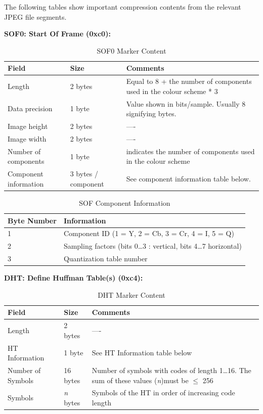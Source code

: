 The following tables show important compression contents from the relevant JPEG file segments.

\newpage

\textbf{SOF0: Start Of Frame (0xc0):}

\begin{table}[!hbtp]
	\caption{SOF0 Marker Content}
	\centering
	\begin{tabular}{ | p{2cm} | p{1.5cm} | p{4cm} | }
	\hline
	\textbf{Field} & \textbf{Size} & \textbf{Comments} \\ \hline
	Length & 2 bytes & Equal to 8 + the number of components used in the colour scheme * 3\\ \hline
	Data precision & 1 byte & Value shown in bits/sample. Usually 8 signifying bytes.\\ \hline
	Image height  & 2 bytes & ----\\ \hline
	Image width  & 2 bytes & ----\\ \hline
	Number of components & 1 byte & indicates the number of components used  in the colour scheme\\ \hline
	Component information & 3 bytes / component & See component information table below.\\ \hline
	\end{tabular}
\end{table}

\begin{table}[!hbtp]
	\caption{SOF Component Information}
	\centering
	\begin{tabular}{ | p{2cm} | p{4cm} | }
	\hline
	\textbf{Byte Number} &  \textbf{Information} \\ \hline
	1 & Component ID (1 = Y, 2 = Cb, 3 = Cr, 4 = I, 5 = Q)\\ \hline
	2 & Sampling factors (bits 0\ldots3 : vertical, bits 4\ldots7 horizontal)\\ \hline
	3 & Quantization table number\\ \hline
	\end{tabular}
\end{table}

\newpage

\textbf{DHT: Define Huffman Table(s) (0xc4):}

\begin{table}[!hbtp]
	\caption{DHT Marker Content}
	\centering
	\begin{tabular}{ | p{2cm} | p{1.5cm} | p{4cm} | }
	\hline
	\textbf{Field} & \textbf{Size} & \textbf{Comments} \\ \hline
	Length & 2 bytes & ----\\ \hline
	HT Information & 1 byte & See HT Information table below\\ \hline
	Number of Symbols  & 16 bytes & Number of symbols with codes of length 1\ldots16.
	The sum of these values (\emph{n})must be $\le$ 256\\ \hline
	Symbols  & \emph{n} bytes & Symbols of the HT in order of increasing code length\\ \hline
	\end{tabular}
\end{table}

